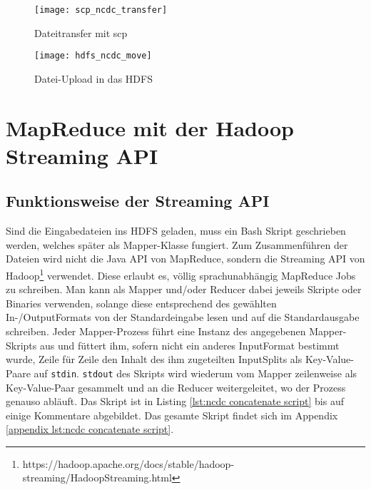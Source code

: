 \begin{figure}[ht]
    \centering
    \texttt{[image: scp\_ncdc\_transfer]}
    \caption[Dateitransfer mit scp]{Dateitransfer mit scp}
    \label{fig:scp transfer}
    \texttt{[image: hdfs\_ncdc\_move]}
    \caption[Datei-Upload in das HDFS]{Datei-Upload in das HDFS}
    \label{fig:hdfs move}
\end{figure}

\section{MapReduce mit der Hadoop Streaming API}
\label{chap:fund sec:core sub:handson mapred streaming}
\subsection{Funktionsweise der Streaming API}
Sind die Eingabedateien ins HDFS geladen, muss ein Bash Skript geschrieben werden, welches später als Mapper-Klasse fungiert. Zum Zusammenführen der Dateien wird nicht die Java API von MapReduce, sondern die Streaming API von Hadoop\footnote{https://hadoop.apache.org/docs/stable/hadoop-streaming/HadoopStreaming.html} verwendet. Diese erlaubt es, völlig sprachunabhängig MapReduce Jobs zu schreiben. Man kann als Mapper und/oder Reducer dabei jeweils Skripte oder Binaries verwenden, solange diese entsprechend des gewählten In-/OutputFormats von der Standardeingabe lesen und auf die Standardausgabe schreiben. Jeder Mapper-Prozess führt eine Instanz des angegebenen Mapper-Skripts aus und füttert ihm, sofern nicht ein anderes InputFormat bestimmt wurde, Zeile für Zeile den Inhalt des ihm zugeteilten InputSplits als Key-Value-Paare auf \verb|stdin|. \verb|stdout| des Skripts wird wiederum vom Mapper zeilenweise als Key-Value-Paar gesammelt und an die Reducer weitergeleitet, wo der Prozess genauso abläuft. Das Skript ist in Listing \ref{lst:ncdc concatenate script} bis auf einige Kommentare abgebildet. Das gesamte Skript findet sich im Appendix \ref{appendix lst:ncdc concatenate script}.    



